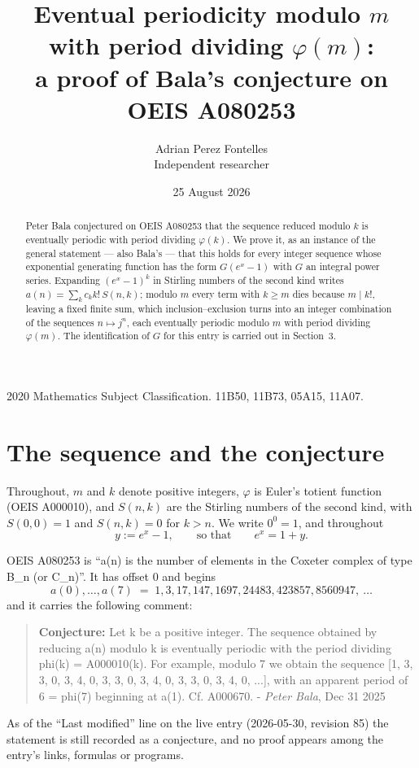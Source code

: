 \documentclass[11pt,a4paper]{article}
\title{Eventual periodicity modulo $m$ with period dividing $\varphi(m)$:\\a proof of Bala's conjecture on OEIS A080253}
\author{Adrian Perez Fontelles\\ \small Independent researcher}
\date{25 August 2026}
\theoremstyle{plain}
\theoremstyle{definition}
\begin{document}
\maketitle

\begin{abstract}
Peter Bala conjectured on OEIS A080253 that the sequence reduced modulo $k$ is eventually periodic with period dividing $\varphi(k)$. We prove it, as an instance of the general statement --- also Bala's --- that this holds for every integer sequence whose exponential generating function has the form $G(e^{x}-1)$ with $G$ an integral power series. Expanding $(e^{x}-1)^{k}$ in Stirling numbers of the second kind writes $a(n)=\sum_{k}c_{k}k!\,S(n,k)$; modulo $m$ every term with $k\ge m$ dies because $m\mid k!$, leaving a fixed finite sum, which inclusion--exclusion turns into an integer combination of the sequences $n\mapsto j^{n}$, each eventually periodic modulo $m$ with period dividing $\varphi(m)$. The identification of $G$ for this entry is carried out in Section~3.
\end{abstract}

\noindent\small 2020 Mathematics Subject Classification. 11B50, 11B73, 05A15, 11A07.\normalsize

\section{The sequence and the conjecture}

Throughout, $m$ and $k$ denote positive integers, $\varphi$ is Euler's totient function
(OEIS A000010), and $S(n,k)$ are the Stirling numbers of the second kind, with
$S(0,0)=1$ and $S(n,k)=0$ for $k>n$. We write $0^{0}=1$, and throughout
\[
y := e^{x}-1, \qquad\text{so that}\qquad e^{x}=1+y .
\]

OEIS A080253 is ``a(n) is the number of elements in the Coxeter complex of type B\_n (or C\_n)''. It has offset $0$ and begins
\[
a(0),\dots,a(7)\;=\;1, 3, 17, 147, 1697, 24483, 423857, 8560947,\ \dots
\]
and it carries the following comment:
\begin{quote}\small
\textbf{Conjecture:} Let k be a positive integer. The sequence obtained by reducing a(n) modulo k is eventually periodic with the period dividing phi(k) = A000010(k). For example, modulo 7 we obtain the sequence [1, 3, 3, 0, 3, 4, 0, 3, 3, 0, 3, 4, 0, 3, 3, 0, 3, 4, 0, ...], with an apparent period of 6 = phi(7) beginning at a(1). Cf. A000670. - \emph{Peter Bala}, Dec 31 2025
\end{quote}
As of the ``Last modified'' line on the live entry (2026-05-30, revision 85) the
statement is still recorded as a conjecture, and no proof appears among the entry's links,
formulas or programs.
\end{document}
